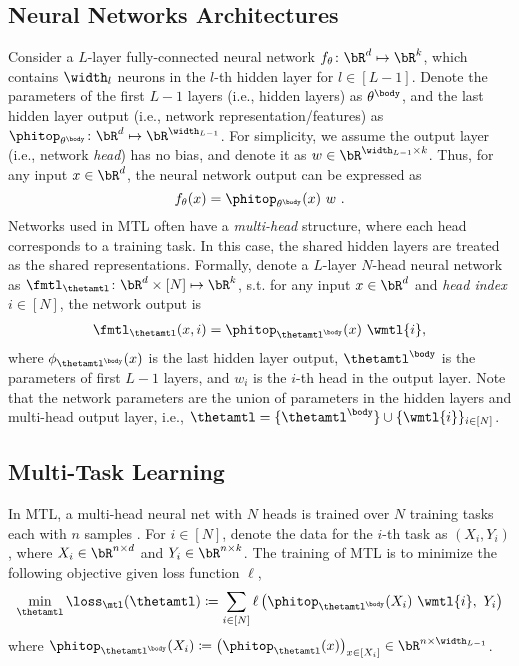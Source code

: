 \documentclass{article}
\begin{document}
\subsection{Neural Networks Architectures}
Consider a $L$-layer fully-connected neural network $f_\theta \colon \bR^{d} \mapsto \bR^{k}$, which contains $\width_{l}$ neurons in the $l$-th hidden layer for $l\in[L-1]$. Denote the parameters of the first $L-1$ layers (i.e., hidden layers) as $\theta^{\body}$, and the last hidden layer output (i.e., network representation/features) as $\phitop_{\theta^\body}\colon \bR^{d}\mapsto \bR^{\width_{L-1}}$. For simplicity, we assume the output layer (i.e., network \textit{head}) has no bias, and denote it as $w \in \bR^{\width_{L-1}\times k}$. Thus, for any input $x\in \bR^{d}$, the neural network output can be expressed as $$f_\theta(x) = \phitop_{\theta^\body}(x) ~ w ~.$$
Networks used in MTL often have a \emph{multi-head} structure, where each head corresponds to a training task. In this case, the shared hidden layers are treated as the shared representations. Formally, denote a $L$-layer $N$-head neural network as $\fmtl_\thetamtl \colon \bR^{d} \times [N] \mapsto \bR^{k}$, s.t. for any input $x\in \bR^{d}$ and \textit{head index} $i\in [N]$, the network output is
\begin{align}
    \fmtl_{\thetamtl}(x,i) =\phitop_{\thetamtl^\body}(x) ~ \wmtl{i},
\end{align}
where $\phi_{\thetamtl^\body}(x)$ is the last hidden layer output, $\thetamtl^\body$ is the parameters of first $L-1$ layers, and $w_i$ is the $i$-th head in the output layer. Note that the network parameters are the union of parameters in the hidden layers and multi-head output layer, i.e., $\thetamtl = \{\thetamtl^\body\}\cup \{\wmtl{i}\}_{i\in[N]}$.

\vspace{-0.5em}
\subsection{Multi-Task Learning}\label{sec:prelim:mtl}
In MTL, a multi-head neural net with $N$ heads is trained over $N$ training tasks each with $n$ samples \cite{ruder2017overview}. For $i\in[N]$, denote the data for the $i$-th task as $(X_i,Y_i)$, where $X_i\in \bR^{n\times d}$ and $Y_i \in \bR^{n\times k}$. The training of MTL is to minimize the following objective given loss function $\ell$,
\begin{align}\label{eq:prelim:mtl-loss}
    \min_{\thetamtl} \loss_\mtl(\thetamtl) \coloneqq
\sum_{i\in [N]} \ell \left(\phitop_{\thetamtl^\body}(X_i)~\wmtl{i}, ~Y_i\right)
\end{align}
where $\phitop_{\thetamtl^\body}(X_i) \coloneqq \big(\phitop_{\thetamtl}(x)\big)_{x\in[X_i]}\in \bR^{n\times \width_{L-1}}$.
\end{document}
